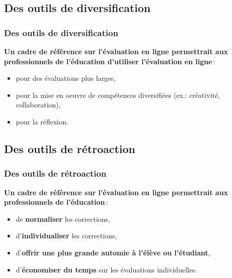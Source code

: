 \documentclass{beamer}
\begin{document}
			\subsection{Des outils de diversification} 
				\begin{frame}
			 		\frametitle{Des outils de diversification\citep{Dubreucq2011}}
			 		\textbf{Un cadre de référence sur l'évaluation en ligne permettrait aux professionnels de l'éducation d'utiliser l'évaluation en ligne}\,: 
					\begin {itemize}
						\item pour des évaluations plus larges,
						\item pour la mise en oeuvre de compétences diversifiées (ex.: créativité, collaboration),
						\item pour la réflexion.
					\end{itemize}
				\end{frame}
				
			\subsection{Des outils de rétroaction} 
				\begin{frame}
			 		\frametitle{Des outils de rétroaction\citep{Dubreucq2011}}
					\textbf{Un cadre de référence sur l'évaluation en ligne permettrait aux professionnels de l'éducation}\,: 
					\begin {itemize}
						\item de \textbf  {normaliser} les corrections,
						\item d'\textbf {individualiser} les corrections,
						\item d'\textbf{offrir une plus grande automie à l'élève ou l'étudiant},
						\item d'\textbf{économiser du temps} sur les évaluations individuelles.
					\end{itemize}
				\end{frame}
				
\end{document}
